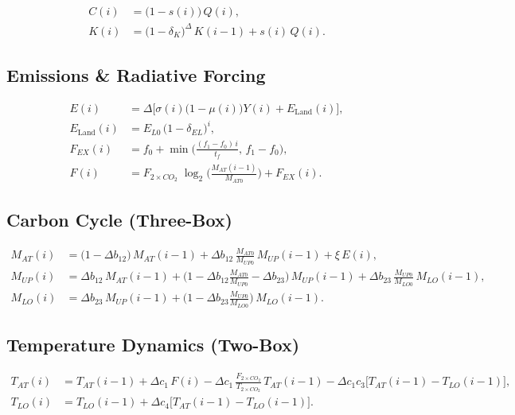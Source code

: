 \documentclass[11pt]{scrartcl}%
\theoremstyle{mytheoremstyle}
\theoremstyle{plain}
\begin{document}
\begin{align}
C(i)  & = \big(1 - s(i)\big)\,Q(i),\\
K(i)  & = \big(1-\delta_{K}\big)^{\Delta}\,K(i-1) + s(i)\,Q(i).
\end{align}


\subsection*{Emissions \& Radiative Forcing}%

\begin{align}
E(i) &  =\Delta\Big[\sigma(i)\big(1-\mu(i)\big)Y(i)+E_{\text{Land}}(i)\Big],\\
E_{\text{Land}}(i) &  =E_{L0}\,\big(1-\delta_{EL}\big)^{i},\\
F_{EX}(i) &  =f_{0}+\min\!\Big(\tfrac{(f_{1}-f_{0})\,i}{t_{f}},\,f_{1}%
-f_{0}\Big),\\
F(i) &  =F_{2\times CO_{2}}\;\log_{2}\!\Big(\tfrac{M_{AT}(i-1)}{M_{AT0}%
}\Big)+F_{EX}(i).
\end{align}


\subsection*{Carbon Cycle (Three-Box)}%

\begin{align}
M_{AT}(i)  & = \big(1-\Delta b_{12}\big)\,M_{AT}(i-1) + \Delta b_{12}%
\,\frac{M_{AT0}}{M_{UP0}}\,M_{UP}(i-1) + \xi\,E(i),\\
M_{UP}(i)  & = \Delta b_{12}\,M_{AT}(i-1) + \Big(1-\Delta b_{12}\tfrac
{M_{AT0}}{M_{UP0}}-\Delta b_{23}\Big)\,M_{UP}(i-1) + \Delta b_{23}%
\,\frac{M_{UP0}}{M_{LO0}}\,M_{LO}(i-1),\\
M_{LO}(i)  & = \Delta b_{23}\,M_{UP}(i-1) + \Big(1-\Delta b_{23}\tfrac
{M_{UP0}}{M_{LO0}}\Big)\,M_{LO}(i-1).
\end{align}


\subsection*{Temperature Dynamics (Two-Box)}%

\begin{align}
T_{AT}(i) &  =T_{AT}(i-1)+\Delta c_{1}\,F(i)-\Delta c_{1}\,\frac{F_{2\times
CO_{2}}}{T_{2\times CO_{2}}}\,T_{AT}(i-1)-\Delta c_{1}c_{3}\big[T_{AT}%
(i-1)-T_{LO}(i-1)\big],\\
T_{LO}(i) &  =T_{LO}(i-1)+\Delta c_{4}\big[T_{AT}(i-1)-T_{LO}(i-1)\big].
\end{align}
\end{document}

